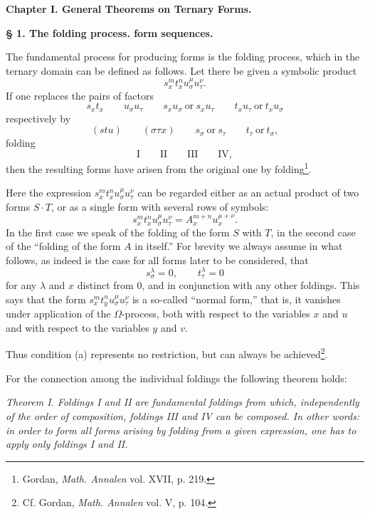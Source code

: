 \documentclass[11pt]{article}
\begin{document}
\begin{center}
{\Large\bfseries Chapter I. \quad General Theorems on Ternary Forms.}
\end{center}

\begin{center}
\textbf{§ 1. \quad The folding process. \quad form sequences.}
\end{center}

The fundamental process for producing forms is the folding process, which in the ternary domain can be defined as follows. Let there be given a symbolic product
\[
s_x^m t_x^n u_\sigma^\mu u_\tau^\nu .
\]
If one replaces the pairs of factors
\[
s_xt_x\qquad u_\sigma u_\tau\qquad s_xu_\sigma\ \text{or}\ s_xu_\tau
\qquad t_xu_\tau\ \text{or}\ t_xu_\sigma
\]
respectively by
\[
(stu)\qquad (\sigma\tau x)\qquad s_\sigma\ \text{or}\ s_\tau
\qquad t_\tau\ \text{or}\ t_\sigma,
\]
folding
\[
\text{I}\qquad\text{II}\qquad\text{III}\qquad\text{IV},
\]
then the resulting forms have arisen from the original one by folding\footnote{Gordan, \emph{Math. Annalen} vol. XVII, p. 219.}.

Here the expression $s_x^m t_x^n u_\sigma^\mu u_\tau^\nu$ can be regarded either as an actual product of two forms $S\cdot T$, or as a single form with several rows of symbols:
\[
s_x^m t_x^n u_\sigma^\mu u_\tau^\nu=A_x^{m+n}u_x^{\mu+\nu}.
\]
In the first case we speak of the folding of the form $S$ with $T$, in the second case of the ``folding of the form $A$ in itself.'' For brevity we always assume in what follows, as indeed is the case for all forms later to be considered, that
\[
\tag{a}
s_\sigma^\lambda=0,\qquad t_\tau^\lambda=0
\]
for any $\lambda$ and $x$ distinct from 0, and in conjunction with any other foldings. This says that the form $s_x^m t_y^n u_\sigma^\mu u_\tau^\nu$ is a so-called ``normal form,'' that is, it vanishes under application of the $\Omega$-process, both with respect to the variables $x$ and $u$ and with respect to the variables $y$ and $v$.

Thus condition (a) represents no restriction, but can always be achieved\footnote{Cf. Gordan, \emph{Math. Annalen} vol. V, p. 104.}.

For the connection among the individual foldings the following theorem holds:

\emph{Theorem I. Foldings I and II are fundamental foldings from which, independently of the order of composition, foldings III and IV can be composed. In other words: in order to form all forms arising by folding from a given expression, one has to apply only foldings I and II.}
\end{document}
